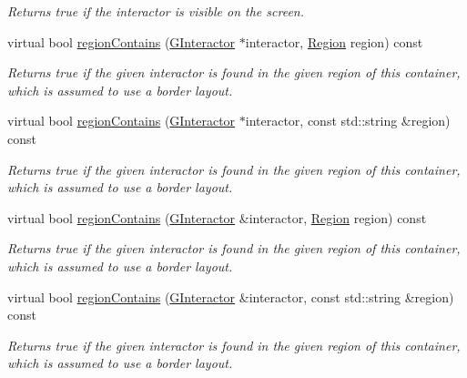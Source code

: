 \begin{DoxyCompactItemize}
\begin{DoxyCompactList}\small\item\em Returns true if the interactor is visible on the screen. \end{DoxyCompactList}\item 
virtual bool \mbox{\hyperlink{classGContainer_a8909db9abf4dc80058f9e4a7b90ea2d0}{region\+Contains}} (\mbox{\hyperlink{classGInteractor}{G\+Interactor}} $\ast$interactor, \mbox{\hyperlink{classGContainer_a81a01a86de31071a92e6cce0bab9bc4b}{Region}} region) const
\begin{DoxyCompactList}\small\item\em Returns true if the given interactor is found in the given region of this container, which is assumed to use a border layout. \end{DoxyCompactList}\item 
virtual bool \mbox{\hyperlink{classGContainer_a84a56bae6b8883d27e44d51c31b2bfc5}{region\+Contains}} (\mbox{\hyperlink{classGInteractor}{G\+Interactor}} $\ast$interactor, const std\+::string \&region) const
\begin{DoxyCompactList}\small\item\em Returns true if the given interactor is found in the given region of this container, which is assumed to use a border layout. \end{DoxyCompactList}\item 
virtual bool \mbox{\hyperlink{classGContainer_aa4cf95952747fd421a2b005eedbc662c}{region\+Contains}} (\mbox{\hyperlink{classGInteractor}{G\+Interactor}} \&interactor, \mbox{\hyperlink{classGContainer_a81a01a86de31071a92e6cce0bab9bc4b}{Region}} region) const
\begin{DoxyCompactList}\small\item\em Returns true if the given interactor is found in the given region of this container, which is assumed to use a border layout. \end{DoxyCompactList}\item 
virtual bool \mbox{\hyperlink{classGContainer_ad67deacd62d3248fbe57ccbd4e96fb50}{region\+Contains}} (\mbox{\hyperlink{classGInteractor}{G\+Interactor}} \&interactor, const std\+::string \&region) const
\begin{DoxyCompactList}\small\item\em Returns true if the given interactor is found in the given region of this container, which is assumed to use a border layout. \end{DoxyCompactList}\item 

\end{DoxyCompactItemize}
